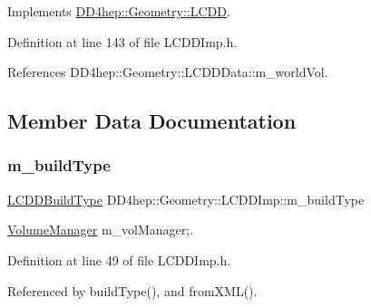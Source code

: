 Implements \hyperlink{class_d_d4hep_1_1_geometry_1_1_l_c_d_d_aa7d089039516ff312cf95168288019fe}{D\+D4hep\+::\+Geometry\+::\+L\+C\+DD}.



Definition at line 143 of file L\+C\+D\+D\+Imp.\+h.



References D\+D4hep\+::\+Geometry\+::\+L\+C\+D\+D\+Data\+::m\+\_\+world\+Vol.



\subsection{Member Data Documentation}
\hypertarget{class_d_d4hep_1_1_geometry_1_1_l_c_d_d_imp_a5cd51ba18f6d2e7723acc93d9b7a90e4}{}\label{class_d_d4hep_1_1_geometry_1_1_l_c_d_d_imp_a5cd51ba18f6d2e7723acc93d9b7a90e4} 
\subsubsection{\texorpdfstring{m\+\_\+build\+Type}{m\_buildType}}
{\footnotesize\ttfamily \hyperlink{namespace_d_d4hep_acafe43ba4537ab6e999e808142965fab}{L\+C\+D\+D\+Build\+Type} D\+D4hep\+::\+Geometry\+::\+L\+C\+D\+D\+Imp\+::m\+\_\+build\+Type\hspace{0.3cm}{\ttfamily [protected]}}



\hyperlink{class_d_d4hep_1_1_geometry_1_1_volume_manager}{Volume\+Manager} m\+\_\+vol\+Manager;. 



Definition at line 49 of file L\+C\+D\+D\+Imp.\+h.



Referenced by build\+Type(), and from\+X\+M\+L().

\hypertarget{class_d_d4hep_1_1_geometry_1_1_l_c_d_d_imp_ae90ce0f851d3887bb833a42fa34c6aea}{}\label{class_d_d4hep_1_1_geometry_1_1_l_c_d_d_imp_ae90ce0f851d3887bb833a42fa34c6aea} 
